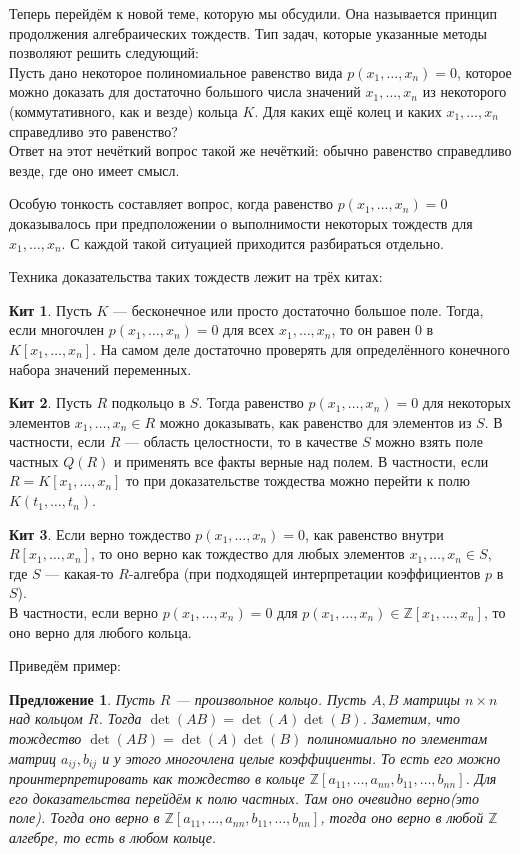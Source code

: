 \documentclass[10pt,a4paper,oneside]{book}
\newtheorem{predl}{Предложение}
\theoremstyle{definition}
\newtheorem{kit}{Кит}
\newcommand{\mb}[1]{\mathbb{#1}}
\def\prdl{\begin{predl}}
\def\eprdl{\end{predl}}
\begin{document}
Теперь перейдём к новой теме, которую мы обсудили. Она называется принцип продолжения алгебраических тождеств. Тип задач, которые указанные методы позволяют решить следующий:\\
Пусть дано некоторое полиномиальное равенство вида $p(x_1,\dots, x_n)=0$, которое можно доказать для достаточно большого числа значений $x_1,\dots,x_n$ из некоторого (коммутативного, как и везде) кольца $K$. Для каких ещё колец и каких $x_1,\dots, x_n$ справедливо это равенство?\\
Ответ на этот нечёткий вопрос такой же нечёткий: обычно равенство справедливо везде, где оно имеет смысл.

Особую тонкость составляет вопрос, когда равенство $p(x_1,\dots, x_n)=0$ доказывалось при предположении о выполнимости некоторых тождеств для $x_1,\dots,x_n$. С каждой такой ситуацией приходится разбираться отдельно.

Техника доказательства таких тождеств лежит на трёх китах:
\begin{kit}
Пусть $K$ --- бесконечное или просто достаточно большое поле. Тогда, если многочлен $p(x_1,\dots,x_n)=0$ для всех $x_1,\dots,x_n$, то он равен 0 в $K[x_1,\dots,x_n]$. На самом деле достаточно проверять для определённого конечного набора значений переменных. 
\end{kit}

\begin{kit}
Пусть $R$ подкольцо в $S$. Тогда равенство $p(x_1,\dots,x_n)=0$ для некоторых элементов $x_1,\dots,x_n\in R$ можно доказывать, как равенство  для элементов из $S$. В частности, если $R$ --- область целостности, то в качестве $S$ можно взять поле частных $Q(R)$ и применять все факты верные над полем. В частности, если $R=K[x_1,\dots,x_n]$ то при доказательстве тождества можно перейти к полю $K(t_1,\dots,t_n)$.
\end{kit}


\begin{kit}
Если верно тождество $p(x_1,\dots,x_n)=0$, как равенство внутри $R[x_1,\dots,x_n]$, то оно верно как тождество для любых элементов $x_1,\dots, x_n\in S$, где $S$ --- какая-то $R$-алгебра (при подходящей интерпретации коэффициентов $p$ в $S$). 
\\

В частности, если верно $p(x_1,\dots,x_n)=0$ для $p(x_1,\dots,x_n)\in \mb Z[x_1,\dots,x_n]$, то оно верно для любого кольца.
\end{kit}

Приведём пример: 
\prdl
Пусть $R$ --- произвольное кольцо. Пусть $A,B$ матрицы $n\times n$ над кольцом $R$. Тогда $\det(AB)=\det(A)\det(B)$.
\proof
Заметим, что тождество $\det(AB)=\det(A)\det(B)$  полиномиально по элементам матриц $a_{ij}, b_{ij}$ и у этого многочлена целые коэффициенты. То есть его можно проинтерпретировать как тождество в кольце $\mb Z[a_{11},\dots,a_{nn},b_{11},\dots,b_{nn}]$. Для его доказательства перейдём к полю частных. Там оно очевидно верно(это поле). Тогда оно верно в $\mb Z[a_{11},\dots,a_{nn},b_{11},\dots,b_{nn}]$, тогда оно верно в любой $\mb Z$ алгебре, то есть в любом кольце.
\eprdl
\end{document}
